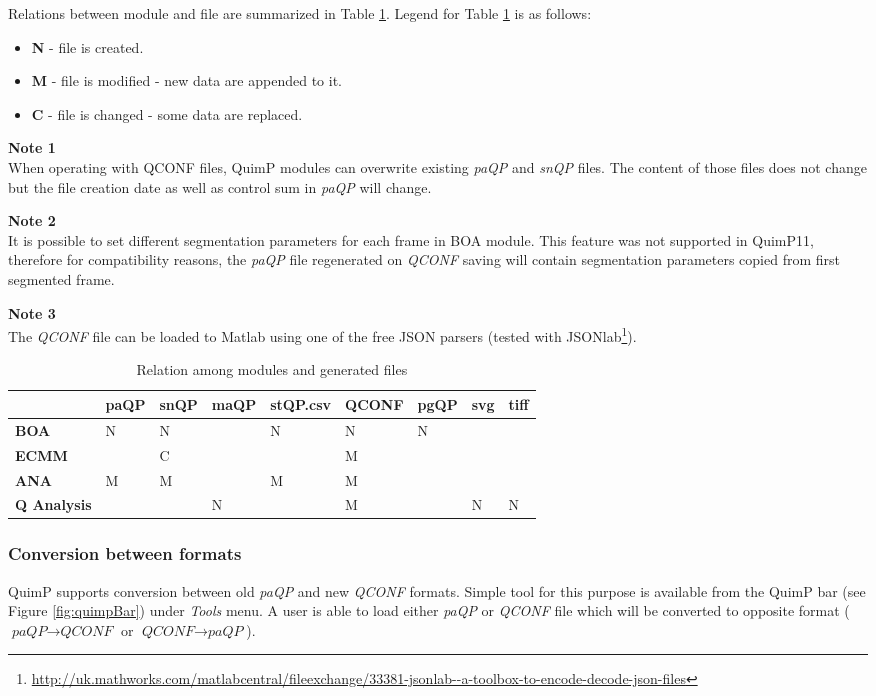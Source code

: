 \documentclass[a4paper,12pt]{article}
\begin{document}
Relations between module and file are summarized in Table \ref{filestable}. Legend for Table \ref{filestable} is as follows:
\begin{itemize}
	\item \textbf{N} - file is created.
	\item \textbf{M} - file is modified - new data are appended to it.
	\item \textbf{C} - file is changed - some data are replaced.
\end{itemize}
\textbf{Note 1} \\
When operating with QCONF files, QuimP modules can overwrite existing \textit{paQP} and \textit{snQP} files. The content of those files does not change but the file creation date as well as control sum in \textit{paQP} will change.

\textbf{Note 2} \\
It is possible to set different segmentation parameters for each frame in BOA module. This feature was not supported in QuimP11, therefore for compatibility reasons, the \textit{paQP} file regenerated on \textit{QCONF} saving will contain segmentation parameters copied from first segmented frame.

\textbf{Note 3} \\
The \textit{QCONF} file can be loaded to Matlab using one of the free JSON parsers (tested with JSONlab\footnote{\url{http://uk.mathworks.com/matlabcentral/fileexchange/33381-jsonlab--a-toolbox-to-encode-decode-json-files}}).

\begin{table}[]
	\centering
	\caption{Relation among modules and generated files}
	\label{filestable}
	\begin{tabular}{|l|l|l|l|l|l|l|l|l|}
		&  \textbf{paQP}&  \textbf{snQP}&  \textbf{maQP}&  \textbf{stQP.csv}&  \textbf{QCONF}&  \textbf{pgQP}& \textbf{svg}&  \textbf{tiff}\\ \hline
		\textbf{BOA} &   N&  N&  &  N&  N&  N&  &  \\
		\textbf{ECMM}&    &  C&  &   &  M&   &  &  \\
		\textbf{ANA} &   M&  M&  &  M&  M&   &  &  \\
		\textbf{Q Analysis}&  &  &  N&  &  M&  &  N& N 
	\end{tabular}
\end{table}


\subsubsection{Conversion between formats}
QuimP supports conversion between old \textit{paQP} and new \textit{QCONF} formats. Simple tool for this purpose is available from the QuimP bar (see Figure \ref{fig:quimpBar}) under \textit{Tools} menu. A user is able to load either \textit{paQP} or \textit{QCONF} file which will be converted to opposite format ($\textit{paQP} \rightarrow \textit{QCONF}$ or $\textit{QCONF} \rightarrow \textit{paQP}$).
\end{document}
